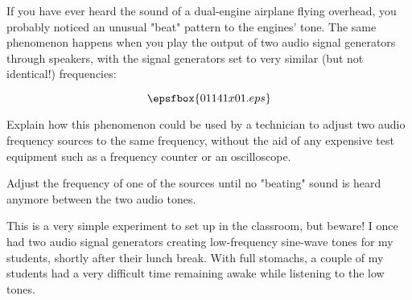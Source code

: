 

If you have ever heard the sound of a dual-engine airplane flying overhead, you probably noticed an unusual "beat" pattern to the engines' tone.  The same phenomenon happens when you play the output of two audio signal generators through speakers, with the signal generators set to very similar (but not identical!) frequencies:

$$\epsfbox{01141x01.eps}$$

Explain how this phenomenon could be used by a technician to adjust two audio frequency sources to the same frequency, without the aid of any expensive test equipment such as a frequency counter or an oscilloscope.







Adjust the frequency of one of the sources until no "beating" sound is heard anymore between the two audio tones.







This is a very simple experiment to set up in the classroom, but beware!  I once had two audio signal generators creating low-frequency sine-wave tones for my students, shortly after their lunch break.  With full stomachs, a couple of my students had a very difficult time remaining awake while listening to the low tones.



